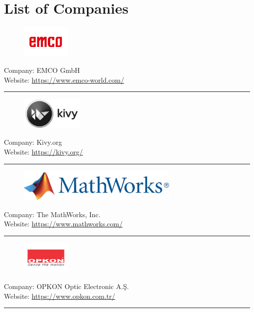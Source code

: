 \chapter{List of Companies}
\label{AppendixListOfCompanies}

\begin{figure}[h!]
\includegraphics[height=1.6cm]{Pictures/EmcoLogo.png}
\end{figure}
\vspace{3mm}
Company:  EMCO GmbH\\
Website: \url{https://www.emco-world.com/}
\vspace{5mm}
\hrule
\vspace{10mm}

\begin{figure}[h!]
\includegraphics[height=1.6cm]{Pictures/KivyLogo.jpg}
\end{figure}
\vspace{3mm}
Company: Kivy.org\\
Website: \url{https://kivy.org/}
\vspace{5mm}
\hrule
\vspace{10mm}

\begin{figure}[h!]
\includegraphics[height=1.6cm]{Pictures/AppMathworksLogo}
\end{figure}
\vspace{3mm}
Company: The MathWorks, Inc.\\
Website: \url{https://www.mathworks.com/}
\vspace{5mm}
\hrule
\vspace{10mm}

\begin{figure}[h!]
\includegraphics[height=1.6cm]{Pictures/OpkonLogo.jpg}
\end{figure}
\vspace{3mm}
Company: OPKON Optic Electronic A.Ş.\\
Website: \url{https://www.opkon.com.tr/}
\vspace{5mm}
\hrule
\vspace{10mm}

